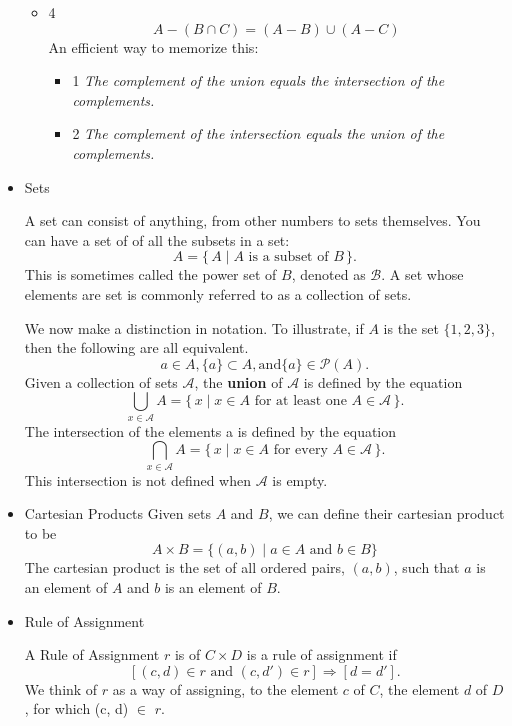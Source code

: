 \documentclass[a4paper]{report}
\begin{document}
\begin{itemize}
\begin{itemize}
		\item 4 $$A - \left( B \cap C \right) = \left( A - B \right) \cup \left( A - C \right) $$
			An efficient way to memorize this:
			\begin{itemize}
				\item 1 \textit{The complement of the union equals the intersection of the complements.}
				\item 2 \textit{The complement of the intersection equals the union of the complements.} 
			\end{itemize}
	\end{itemize}

\item Sets
	
	A set can consist of anything, from other numbers to sets themselves. You can have a set of of all the subsets in a set:
			$$ A = \{\, A \mid A \text{ is a subset of } B \,\}.$$
		This is sometimes called the power set of $B$, denoted as $\mathcal{B}$.
	A set whose elements are set is commonly referred to as a collection of sets. 
	
		We now make a distinction in notation. To illustrate, if $A$ is the set $\{1, 2, 3\}$, then the following are all equivalent. 
		$$a \in A,     \{a\} \subset A, \text{and} \{a\} \in  \mathcal{P}(A). $$
	Given a collection of sets $\mathcal{A}$, the \textbf{union} of $\mathcal{A}$ is defined by the equation 
		 \[
			 \bigcup_{x \in \mathcal{A}} A = \{\, x \mid x \in A\text{ for at least one } A \in \mathcal{A} \,\}.
		 \]
	The intersection of the elements a is defined by the equation 
		\[
			 \bigcap_{x \in \mathcal{A}} A = \{\, x \mid x \in A\text{ for every } A \in \mathcal{A} \,\}.
		\]
	This intersection is not defined when $\mathcal{A}$ is empty.

\item Cartesian Products
	Given sets $A$ and $B$, we can define their cartesian product to be 
	\[
		A \times B = \{ (a, b) \mid a \in A  \text{ and }  b \in B \}
	\]
	The cartesian product is the set of all ordered pairs, $(a, b)$, such that $a$ is an element of $A$ and $b$ is an element of $B$.

\item Rule of Assignment

	A Rule of Assignment $r$ is of $C \times D$ is a rule of assignment if 
		\[
			[(c, d) \in r \text{ and } (c, d') \in r] \Longrightarrow [d = d'].
		\]
	We think of $r$ as a way of assigning, to the element $c$ of $C$, the element $d$ of $D$, for which (c, d) $\in$ $r$. 


\end{itemize}
\end{document}
